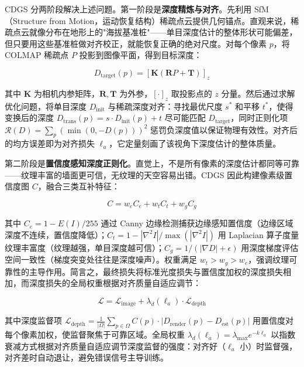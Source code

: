 CDGS 分两阶段解决上述问题。第一阶段是\textbf{深度精炼与对齐}。先利用 SfM（Structure from Motion，运动恢复结构）稀疏点云提供几何锚点。直观来说，稀疏点云就像分布在地形上的"海拔基准桩"——单目深度估计的整体形状可能偏差，但只要用这些基准桩做对齐校正，就能恢复正确的绝对尺度。对每个像素 $p$，将 COLMAP 稀疏点 $P$ 投影到图像平面，得到目标深度：

\begin{equation}
D_{\text{target}}(p) = [\mathbf{K}(\mathbf{R}P + \mathbf{T})]_z
\end{equation}

其中 $\mathbf{K}$ 为相机内参矩阵，$\mathbf{R}, \mathbf{T}$ 为外参，$[\cdot]_z$ 取投影点的 $z$ 分量。然后通过求解优化问题，将单目深度 $D_{\text{init}}$ 与稀疏深度对齐：寻找最优尺度 $s^*$ 和平移 $t^*$，使得变换后的深度 $D_{\text{trans}}(p) = s \cdot D_{\text{init}}(p) + t$ 尽可能匹配 $D_{\text{target}}$，同时正则化项 $\mathcal{R}(D) = \sum_p (\min(0, -D(p)))^2$ 惩罚负深度值以保证物理有效性。对齐后的均方误差即为对齐损失 $\ell_a$，它定量刻画了该视角下深度估计的整体质量。

第二阶段是\textbf{置信度感知深度正则化}。直觉上，不是所有像素的深度估计都同等可靠——纹理丰富的墙面更可信，无纹理的天空容易出错。CDGS 因此构建像素级置信度图 $C$，融合三类互补特征：

\begin{equation}
C = w_e C_e + w_t C_t + w_g C_g
\end{equation}

其中 $C_e = 1 - E(I)/255$ 通过 Canny 边缘检测捕获边缘感知置信度（边缘区域深度不连续，置信度降低）；$C_t = 1 - |\nabla^2 I| / \max(|\nabla^2 I|)$ 用 Laplacian 算子度量纹理丰富度（纹理越强，单目深度越可信）；$C_g = 1 / (|\nabla D| + \epsilon)$ 用深度梯度评估空间一致性（梯度突变处往往是深度噪声）。权重满足 $w_t > w_g > w_e$，强调纹理可靠性的主导作用。简言之，最终损失将标准光度损失与置信度加权的深度损失相加，而深度损失的全局权重根据对齐质量自适应调节：

\begin{equation}
\mathcal{L} = \mathcal{L}_{\text{image}} + \lambda_d(\ell_a) \cdot \mathcal{L}_{\text{depth}}
\end{equation}

其中深度监督项 $\mathcal{L}_{\text{depth}} = \frac{1}{|\Omega|}\sum_{p \in \Omega} C(p) \cdot |D_{\text{render}}(p) - D_{\text{est}}(p)|$ 用置信度对每个像素加权，使监督聚焦于可靠区域。全局权重 $\lambda_d(\ell_a) = \lambda_{\max} e^{-k \ell_a}$ 以指数衰减方式根据对齐质量自适应调节深度监督的强度：对齐好（$\ell_a$ 小）时监督强，对齐差时自动退让，避免错误信号主导训练。

